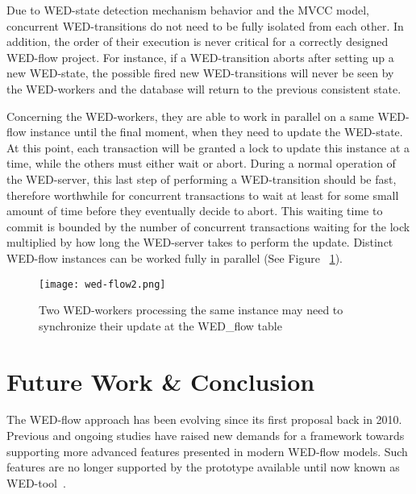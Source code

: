 \documentclass[12pt]{article}
\begin{document}
 Due to WED-state detection mechanism behavior and the MVCC model, concurrent WED-transitions do not need to be fully isolated  from each other. In addition, the order of their execution is never critical for a correctly designed WED-flow project.  For instance, if a WED-transition aborts after setting up a new WED-state, the possible fired new WED-transitions will never be seen by the WED-workers and the database will return to the previous consistent state.  

 Concerning the WED-workers, they are able to work in parallel on a same WED-flow instance until the final moment, when they need to update the WED-state. At this point, each transaction will be granted a lock to update this instance at a time, while the others must either wait or abort. During a normal operation of the WED-server, this last step of performing a WED-transition should be fast, therefore worthwhile for concurrent transactions to wait at least for some small amount of time before they eventually decide to abort. This waiting time to commit is bounded by the number of concurrent transactions waiting for  the lock multiplied by how long the WED-server takes to perform the update. Distinct WED-flow instances can be worked fully in parallel (See Figure ~\ref{fig_wf}).
   
\begin{figure}[!t]
\centering
\texttt{[image: wed-flow2.png]}
\caption{Two WED-workers processing the same instance may need to synchronize their update at the WED\_flow table}
\label{fig_wf}
\end{figure}




\section{Future Work \& Conclusion}
\label{sec:fut}

The WED-flow approach has been evolving since its first proposal back in 2010. Previous and ongoing studies have raised new demands for a framework towards supporting  more advanced features presented in modern WED-flow models. Such features are no longer supported by the prototype available until now known as WED-tool~\cite{WT}. 
\end{document}
